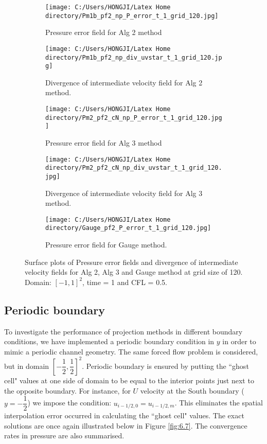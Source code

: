 \begin{figure}[H]
	\centering
	\begin{subfigure}[t]{2.2in}
		\centering
		\texttt{[image: C:/Users/HONGJI/Latex Home directory/Pm1b\_pf2\_np\_P\_error\_t\_1\_grid\_120.jpg]}
		\caption{Pressure error field for Alg 2 method}\label{fig:6.6a}		
	\end{subfigure}
	\quad
	\begin{subfigure}[t]{2.8in}
		\centering
		\texttt{[image: C:/Users/HONGJI/Latex Home directory/Pm1b\_pf2\_np\_div\_uvstar\_t\_1\_grid\_120.jpg]}
		\caption{Divergence of intermediate velocity field for Alg 2 method. }\label{fig:6.6b}
	\end{subfigure}
	\quad
	\centering
	\begin{subfigure}[t]{2.2in}
		\centering
		\texttt{[image: C:/Users/HONGJI/Latex Home directory/Pm2\_pf2\_cN\_np\_P\_error\_t\_1\_grid\_120.jpg]}
		\caption{Pressure error field for Alg 3 method}\label{fig:6.6c}		
	\end{subfigure}
	\quad
	\begin{subfigure}[t]{2.6in}
		\centering
		\texttt{[image: C:/Users/HONGJI/Latex Home directory/Pm2\_pf2\_cN\_np\_div\_uvstar\_t\_1\_grid\_120.jpg]}
		\caption{Divergence of intermediate velocity field for Alg 3 method.}\label{fig:6.6d}
	\end{subfigure}
	\quad
	\begin{subfigure}[t]{2.5in}
		\centering
		\texttt{[image: C:/Users/HONGJI/Latex Home directory/Gauge\_pf2\_P\_error\_t\_1\_grid\_120.jpg]}
		\caption{Pressure error field for Gauge method. }\label{fig:6.6e}
	\end{subfigure}
	\caption{Surface plots of Pressure error fields and divergence of intermediate velocity fields for Alg 2, Alg 3 and Gauge method at grid size of 120. Domain: $[-1,1]^2$, time = 1 and CFL = 0.5. }\label{fig:6.6}
\end{figure}

\subsection*{Periodic boundary}
To investigate the performance of projection methods in different boundary conditions, we have implemented a periodic boundary condition in $y$ in order to mimic a periodic channel geometry. The same forced flow problem is considered, but in domain $[-\dfrac{1}{2},\dfrac{1}{2}]^2$. Periodic boundary is ensured by putting the ``ghost cell" values at one side of domain to be equal to the interior points just next to the opposite boundary. For instance, for $U$ velocity at the South boundary ($y = -\dfrac{1}{2}$) we impose the condition: $u_{i-1/2,0} = u_{i-1/2,m}$. This eliminates the spatial interpolation error occurred in calculating the ``ghost cell" values. The exact solutions are once again illustrated below in Figure \ref{fig:6.7}. The convergence rates in pressure are also summarised.\\

